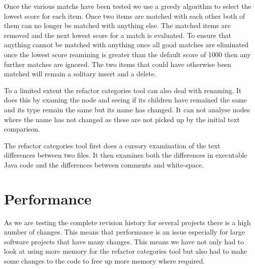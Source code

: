 Once the various matchs have been tested we use a greedy algorithm to select the lowest score for each item.  Once two items are matched with each other both of them can no longer be matched with anything else. The matched items are removed and the next lowest score for a match is evaluated.  To ensure that anything cannot be matched with anything once all good matches are eliminated once the lowest score reamining is greater than the default score of 1000 then any further matches are ignored.  The two items that could have otherwise been matched will remain a solitary insert and a delete.   

To a limited extent the refactor categories tool can also deal with renaming. It does this by examing the node and seeing if its children have remained the same and its type remain the same but its name has changed. It can not analyse nodes where the name has not changed as these are not picked up by the initial text comparison.

The refactor categories tool first does a cursory examination of the text differences between two files. It then examines both the differences in executable Java code and the differences between comments and white-space. 



\section{Performance}
As we are testing the complete revision history for several projects there is a high number of changes.  This means that performance is an issue especially for large software projects that have many changes. This means we have not only had to look at using more memory for the refactor categories tool but also had to make some changes to the code to free up more memory where required.

